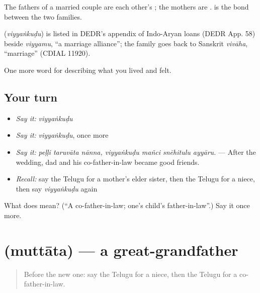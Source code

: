 The fathers of a married couple are each other's ; the mothers are .  is the bond between the two families.

\begin{cousinweb}
\textbf{} (\emph{viyyaṅkuḍu}) is listed in DEDR's appendix of Indo-Aryan loans (DEDR App. 58) beside \emph{viyyamu}, \textquotedblleft{}a marriage alliance\textquotedblright{}; the family goes back to Sanskrit \emph{vivāha}, \textquotedblleft{}marriage\textquotedblright{} (CDIAL 11920).
\end{cousinweb}

\begin{grammarlens}[title={What you've built}]
One more word for describing what you lived and felt.
\end{grammarlens}

\subsection*{Your turn}
\begin{itemize}
\raggedright
  \item \emph{Say it:} \emph{viyyaṅkuḍu}
  \item \emph{Say it:} \emph{viyyaṅkuḍu}, once more
  \item \emph{Say it:} \emph{peḷḷi taruvāta nānna, viyyaṅkuḍu mañci snēhitulu ayyāru.} — After the wedding, dad and his co-father-in-law became good friends.
  \item \emph{Recall:} say the Telugu for a mother's elder sister, then the Telugu for a niece, then say \emph{viyyaṅkuḍu} again
\end{itemize}

\begin{tcolorbox}[breakable,colback=teal!4,colframe=teal!35!black,title={Before you move on}]
What does  mean? (\textquotedblleft{}A co-father-in-law; one's child's father-in-law\textquotedblright{}.) Say it once more.
\end{tcolorbox}
\section[\texorpdfstring{\te{ముత్తాత} (muttāta)}{ముత్తాత (muttāta)}]{ (muttāta) — a great-grandfather}

\label{lesson:TE-C530-muttata}



\begin{quote}
Before the new one: say the Telugu for a niece, then the Telugu for a co-father-in-law.
\end{quote}

